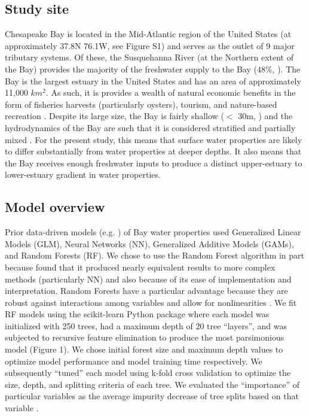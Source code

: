 \documentclass{article}
\begin{document}
\subsection{Study site}

Chesapeake Bay is located in the Mid-Atlantic region of the United States (at approximately 37.8\degree N 76.1\degree W, see Figure S1) and serves as the outlet of 9 major tributary systems. Of these, the Susquehanna River (at the Northern extent of the Bay) provides the majority of the freshwater supply to the Bay (\texttildelow$48\%$, \cite{xuClimateForcingSalinity2012}). The Bay is the largest estuary in the United States and has an area of approximately 11,000 $km^2$. As such, it is provides a wealth of natural economic benefits in the form of fisheries harvests (particularly oysters), tourism, and nature-based recreation \cite{hoodChesapeakeBayProgram2021}. Despite its large size, the Bay is fairly shallow ($<$ 30m, \cite{murphyComparisonSpatialInterpolation2010}) and the hydrodynamics of the Bay are such that it is considered stratified and partially mixed \cite{xuClimateForcingSalinity2012}. For the present study, this means that surface water properties are likely to differ substantially from water properties at deeper depths. It also means that the Bay receives enough freshwater inputs to produce a distinct upper-estuary to lower-estuary gradient in water properties.

\subsection{Model overview}

Prior data-driven models (e.g. \cite{urquhartGeospatialInterpolationMODISderived2013, vogelAssessingSatelliteSea2016}) of Bay water properties used Generalized Linear Models (GLM), Neural Networks (NN), Generalized Additive Models (GAMs), and Random Forests (RF). We chose to use the Random Forest algorithm in part because \cite{urquhartGeospatialInterpolationMODISderived2013} found that it produced nearly equivalent results to more complex methods (particularly NN) and also because of its ease of implementation and interpretation. Random Forests have a particular advantage because they are robust against interactions among variables and allow for nonlinearities \cite{prasadNewerClassificationRegression2006}. We fit RF models using the scikit-learn Python package \cite{pedregosaScikitlearnMachineLearning2011} where each model was initialized with 250 trees, had a maximum depth of 20 tree “layers”, and was subjected to recursive feature elimination to produce the most parsimonious model (Figure 1). We chose initial forest size and maximum depth values to optimize model performance and model training time respectively. We subsequently “tuned” each model using k-fold cross validation to optimize the size, depth, and splitting criteria of each tree. We evaluated the “importance” of particular variables as the average impurity decrease of tree splits based on that variable \cite{pedregosaScikitlearnMachineLearning2011}.
\end{document}
